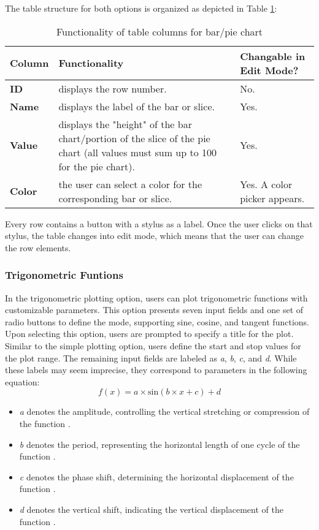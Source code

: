 \documentclass[sn-mathphys-num]{sn-jnl}%
\theoremstyle{thmstyleone}%
\theoremstyle{thmstyletwo}%
\theoremstyle{thmstylethree}%
\begin{document}
The table structure for both options is organized as depicted in Table \ref{tab:functionality}:

\bigskip
\begin{table}[h]
\centering
\begin{tabular}{|l|p{65mm}|p{35mm}|}
\hline
\textbf{Column} & \textbf{Functionality} & \textbf{Changable in Edit Mode?} \\ \hline
\textbf{ID}    & displays the row number. & No. \\ \hline
\textbf{Name}     & displays the label of the bar or slice. & Yes. \\ \hline
\textbf{Value}     & displays the "height" of the bar chart/portion of the slice of the pie chart (all values must sum up to 100 for the pie chart). & Yes.\\ \hline
\textbf{Color}     & the user can select a color for the corresponding bar or slice. & Yes. A color picker appears. \\ \hline
\end{tabular}
\caption{Functionality of table columns for bar/pie chart}
\label{tab:functionality}
\end{table}
\bigskip

Every row contains a button with a stylus as a label. Once the user clicks on that stylus, the table changes into edit mode, which means that the user can change the row elements.

\subsubsection{Trigonometric Funtions}\label{subsubsec4}

In the trigonometric plotting option, users can plot trigonometric functions with customizable parameters. This option presents seven input fields and one set of radio buttons to define the mode, supporting sine, cosine, and tangent functions. Upon selecting this option, users are prompted to specify a title for the plot. Similar to the simple plotting option, users define the start and stop values for the plot range. The remaining input fields are labeled as \textit{a}, \textit{b}, \textit{c}, and \textit{d}. While these labels may seem imprecise, they correspond to parameters in the following equation:
\bigskip
\[ f(x) = a \times \text{sin}(b \times x + c) + d \]


\begin{itemize}
    \item \textit{a} denotes the amplitude, controlling the vertical stretching or compression of the function \cite{mathisfun}.
    \item \textit{b} denotes the period, representing the horizontal length of one cycle of the function \cite{mathisfun}.
    \item \textit{c} denotes the phase shift, determining the horizontal displacement of the function \cite{mathisfun}.
    \item \textit{d} denotes the vertical shift, indicating the vertical displacement of the function \cite{mathisfun}.
\end{itemize}
\end{document}
